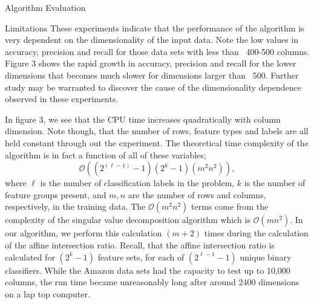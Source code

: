 \documentclass{llncs}
\begin{document}
\begin{section}{Algorithm Evaluation}
\begin{subsection}{Limitations}
These experiments indicate that the performance of the algorithm is very dependent on the dimensionality of the input data. Note the low values in accuracy, precision and recall for those data sets with less than ~400-500 columns. Figure 3 shows the rapid growth in accuracy, precision and recall for the lower dimensions that  becomes much slower for dimensions larger than ~500. Further study may be warranted to discover the cause of the dimensionality dependence observed in these experiments.

In figure 3, we see that the CPU time increases quadratically with column dimension. Note though, that the number of rows, feature types and labels are all held constant through out the experiment. The theoretical time complexity of the algorithm is in fact a function of all of these variables;
$$\mathcal{O}\left((2^{(\ell - 1)}-1)(2^k-1)(m^2n^2)\right),$$
where $\ell$ is the number of classification labels in the problem, $k$ is the number of feature groups present, and $m,n$ are the number of rows and columns, respectively, in the training data. The $\mathcal{O}(m^2n^2)$ terms come from the complexity of the singular value decomposition algorithm which is $\mathcal{O}(mn^2)$\cite{Tesic}. In our algorithm, we perform this calculation $(m + 2)$ times during the calculation of the affine intersection ratio. Recall, that the affine intersection ratio is calculated for $(2^k -1)$ feature sets, for each of $(2^{\ell -1} - 1)$ unique binary classifiers. While the Amazon data sets had the capacity to test up to 10,000 columns, the run time became unreasonably long after around 2400 dimensions on a lap top computer.
\end{subsection}


\end{section}
\end{document}
